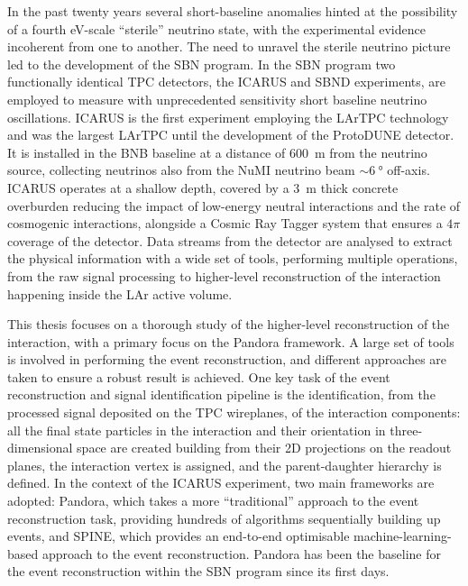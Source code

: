 
\label{chap:conclusions}

\vspace{1em}


In the past twenty years several short-baseline anomalies hinted at the possibility of a fourth eV-scale ``sterile'' neutrino state, with the experimental evidence incoherent from one to another. The need to unravel the sterile neutrino picture led to the development of the SBN program. In the SBN program two functionally identical TPC detectors, the ICARUS and SBND experiments, are employed to measure with unprecedented sensitivity short baseline neutrino oscillations. ICARUS is the first experiment employing the LArTPC technology and was the largest LArTPC until the development of the {ProtoDUNE} detector. It is installed in the BNB baseline at a distance of \SI{600}{\m} from the neutrino source, collecting neutrinos also from the NuMI neutrino beam ${\sim}\SI{6}{\degree}$ off-axis. ICARUS operates at a shallow depth, covered by a \SI{3}{\m} thick concrete overburden reducing the impact of low-energy neutral interactions and the rate of cosmogenic interactions, alongside a Cosmic Ray Tagger system that ensures a $4\pi$ coverage of the detector. Data streams from the detector are analysed to extract the physical information with a wide set of tools, performing multiple operations, from the raw signal processing to higher-level reconstruction of the interaction happening inside the LAr active volume. 

This thesis focuses on a thorough study of the higher-level reconstruction of the interaction, with a primary focus on the Pandora framework. A large set of tools is involved in performing the event reconstruction, and different approaches are taken to ensure a robust result is achieved. One key task of the event reconstruction and signal identification pipeline is the identification, from the processed signal deposited on the TPC wireplanes, of the interaction components: all the final state particles in the interaction and their orientation in three-dimensional space are created building from their 2D projections on the readout planes, the interaction vertex is assigned, and the parent-daughter hierarchy is defined. 
In the context of the ICARUS experiment, two main frameworks are adopted: Pandora, which takes a more ``traditional'' approach to the event reconstruction task, providing hundreds of algorithms sequentially building up events, and SPINE, which provides an end-to-end optimisable machine-learning-based approach to the event reconstruction. Pandora has been the baseline for the event reconstruction within the SBN program since its first days. 

